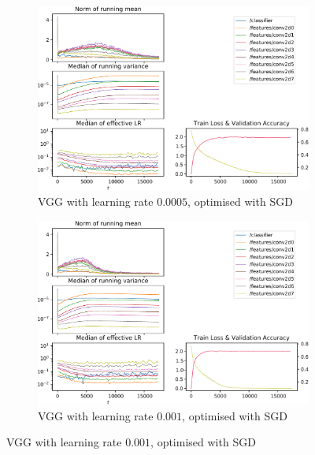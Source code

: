\begin{figure}
    \begin{subfigure}{\textwidth}
        \centering
        \includegraphics[width=\linewidth]{gfx/diagrams/experiments/adam/vgg_sgd_00005_0_-1.pdf}
        \caption{VGG with learning rate $0.0005$, optimised with SGD}
    \end{subfigure}

    \begin{subfigure}{\textwidth}
        \centering
        \includegraphics[width=\linewidth]{gfx/diagrams/experiments/adam/vgg_sgd_0001_0_-1.pdf}
        \caption{VGG with learning rate $0.001$, optimised with SGD}
    \end{subfigure}


\end{figure}
